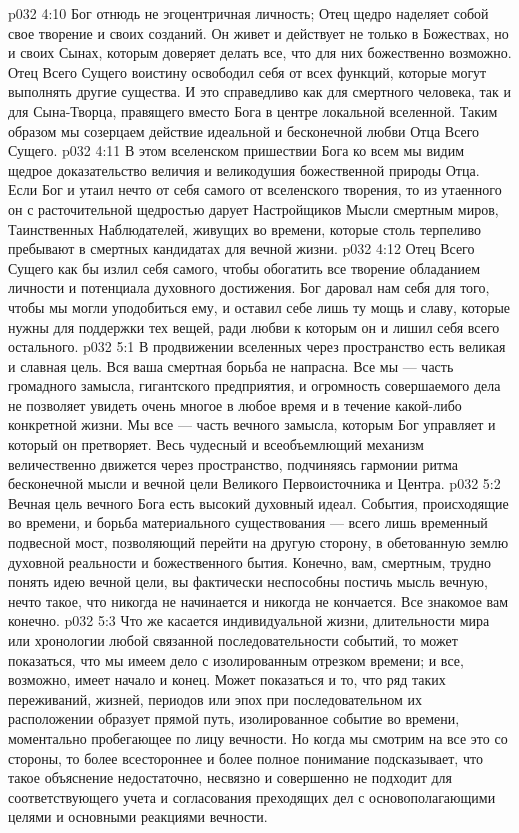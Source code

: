 \vs p032 4:10 \pc Бог отнюдь не эгоцентричная личность; Отец щедро наделяет собой свое творение и своих созданий. Он живет и действует не только в Божествах, но и своих Сынах, которым доверяет делать все, что для них божественно возможно. Отец Всего Сущего воистину освободил себя от всех функций, которые могут выполнять другие существа. И это справедливо как для смертного человека, так и для Сына\hyp{}Творца, правящего вместо Бога в центре локальной вселенной. Таким образом мы созерцаем действие идеальной и бесконечной любви Отца Всего Сущего.
\vs p032 4:11 В этом вселенском пришествии Бога ко всем мы видим щедрое доказательство величия и великодушия божественной природы Отца. Если Бог и утаил нечто от себя самого от вселенского творения, то из утаенного он с расточительной щедростью дарует Настройщиков Мысли смертным миров, Таинственных Наблюдателей, живущих во времени, которые столь терпеливо пребывают в смертных кандидатах для вечной жизни.
\vs p032 4:12 Отец Всего Сущего как бы излил себя самого, чтобы обогатить все творение обладанием личности и потенциала духовного достижения. Бог даровал нам себя для того, чтобы мы могли уподобиться ему, и оставил себе лишь ту мощь и славу, которые нужны для поддержки тех вещей, ради любви к которым он и лишил себя всего остального.
\vs p032 5:1 В продвижении вселенных через пространство есть великая и славная цель. Вся ваша смертная борьба не напрасна. Все мы --- часть громадного замысла, гигантского предприятия, и огромность совершаемого дела не позволяет увидеть очень многое в любое время и в течение какой\hyp{}либо конкретной жизни. Мы все --- часть вечного замысла, которым Бог управляет и который он претворяет. Весь чудесный и всеобъемлющий механизм величественно движется через пространство, подчиняясь гармонии ритма бесконечной мысли и вечной цели Великого Первоисточника и Центра.
\vs p032 5:2 Вечная цель вечного Бога есть высокий духовный идеал. События, происходящие во времени, и борьба материального существования --- всего лишь временный подвесной мост, позволяющий перейти на другую сторону, в обетованную землю духовной реальности и божественного бытия. Конечно, вам, смертным, трудно понять идею вечной цели, вы фактически неспособны постичь мысль вечную, нечто такое, что никогда не начинается и никогда не кончается. Все знакомое вам конечно.
\vs p032 5:3 \pc Что же касается индивидуальной жизни, длительности мира или хронологии любой связанной последовательности событий, то может показаться, что мы имеем дело с изолированным отрезком времени; и все, возможно, имеет начало и конец. Может показаться и то, что ряд таких переживаний, жизней, периодов или эпох при последовательном их расположении образует прямой путь, изолированное событие во времени, моментально пробегающее по лицу вечности. Но когда мы смотрим на все это со стороны, то более всестороннее и более полное понимание подсказывает, что такое объяснение недостаточно, несвязно и совершенно не подходит для соответствующего учета и согласования преходящих дел с основополагающими целями и основными реакциями вечности.
